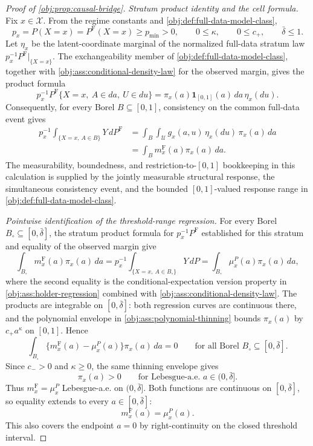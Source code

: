 \begin{proof}[Proof of \cref{obj:prop:causal-bridge}]
\emph{Stratum product identity and the cell formula.}
Fix \(x\in\mathcal X\).  From the regime constants and \cref{obj:def:full-data-model-class},
\[
p_x=P(X=x)=P^{\mathrm F}(X=x)\ge p_{\min}>0,
\qquad
0\le \kappa,\qquad 0\le c_+,\qquad \bar\delta\le 1 .
\]
Let \(\eta_x\) be the latent-coordinate marginal of the normalized full-data
stratum law \(p_x^{-1}P^{\mathrm F}|_{\{X=x\}}\).  The exchangeability member of
\cref{obj:def:full-data-model-class}, together with \cref{obj:ass:conditional-density-law}
for the observed margin, gives the product formula
\[
p_x^{-1}P^{\mathrm F}\{X=x,\ A\in da,\ U\in du\}
=
\pi_x(a)\mathbf 1_{[0,1]}(a)\,da\,\eta_x(du).
\]
Consequently, for every Borel \(B\subseteq[0,1]\), consistency on the common
full-data event gives
\[
\begin{aligned}
p_x^{-1}\int_{\{X=x,\ A\in B\}}Y\,dP^{\mathrm F}
&=
\int_B\int_{\mathcal U}g_x(a,u)\,\eta_x(du)\,\pi_x(a)\,da  \\
&=
\int_B m_x^{\mathrm F}(a)\pi_x(a)\,da .
\end{aligned}
\]
The measurability, boundedness, and restriction-to-\([0,1]\) bookkeeping in
this calculation is supplied by the jointly measurable structural response,
the simultaneous consistency event, and the bounded \([0,1]\)-valued response
range in \cref{obj:def:full-data-model-class}. %

\emph{Pointwise identification of the threshold-range regression.}
For every Borel \(B_\circ\subseteq[0,\bar\delta]\), the stratum product formula for
\(p_x^{-1}P^{\mathrm F}\) established for this stratum and equality of the observed
margin give
\[
\int_{B_\circ}m_x^{\mathrm F}(a)\pi_x(a)\,da
=
p_x^{-1}\int_{\{X=x,\ A\in B_\circ\}}Y\,dP
=
\int_{B_\circ}\mu_x^P(a)\pi_x(a)\,da,
\]
where the second equality is the conditional-expectation version property in
\cref{obj:ass:holder-regression} combined with \cref{obj:ass:conditional-density-law}.
The products are integrable on \([0,\bar\delta]\): both regression curves are
continuous there, and the polynomial envelope in
\cref{obj:ass:polynomial-thinning} bounds \(\pi_x(a)\) by \(c_+a^\kappa\) on
\([0,1]\).  Hence
\[
\int_{B_\circ}\{m_x^{\mathrm F}(a)-\mu_x^P(a)\}\pi_x(a)\,da=0
\qquad
\text{for all Borel }B_\circ\subseteq[0,\bar\delta].
\]
Since \(c_->0\) and \(\kappa\ge0\), the same thinning envelope gives
\[
\pi_x(a)>0
\qquad\text{for Lebesgue-a.e. }a\in(0,\bar\delta].
\]
Thus \(m_x^{\mathrm F}=\mu_x^P\) Lebesgue-a.e. on \((0,\bar\delta]\).  Both
functions are continuous on \([0,\bar\delta]\), so equality extends to every
\(a\in[0,\bar\delta]\):
\[
m_x^{\mathrm F}(a)=\mu_x^P(a).
\]
This also covers the endpoint \(a=0\) by right-continuity on the closed
threshold interval. %


\end{proof}
